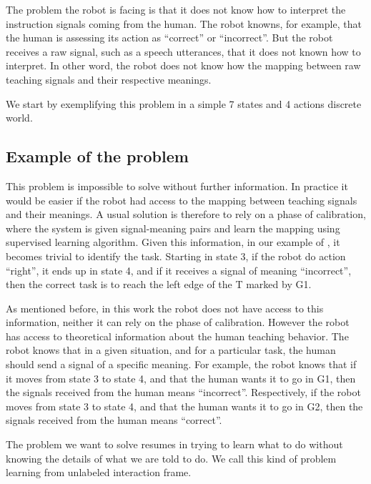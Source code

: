 The problem the robot is facing is that it does not know how to interpret the instruction signals coming from the human. The robot knowns, for example, that the human is assessing its action as ``correct'' or ``incorrect''. But the robot receives a raw signal, such as a speech utterances, that it does not known how to interpret. In other word, the robot does not know how the mapping between raw teaching signals and their respective meanings.

We start by exemplifying this problem in a simple 7 states and 4 actions discrete world.

\subsection{Example of the problem}
\label{chapter:lfui:example}




\transition

This problem is impossible to solve without further information. In practice it would be easier if the robot had access to the mapping between teaching signals and their meanings. A usual solution is therefore to rely on a phase of calibration, where the system is given signal-meaning pairs and learn the mapping using supervised learning algorithm. Given this information, in our example of , it becomes trivial to identify the task. Starting in state 3, if the robot do action ``right'', it ends up in state 4, and if it receives a signal of meaning ``incorrect'', then the correct task is to reach the left edge of the T marked by G1.

As mentioned before, in this work the robot does not have access to this information, neither it can rely on the phase of calibration. However the robot has access to theoretical information about the human teaching behavior. The robot knows that in a given situation, and for a particular task, the human should send a signal of a specific meaning. For example, the robot knows that if it moves from state 3 to state 4, and that the human wants it to go in G1, then the signals received from the human means ``incorrect''. Respectively, if the robot moves from state 3 to state 4, and that the human wants it to go in G2, then the signals received from the human means ``correct''.

The problem we want to solve resumes in trying to learn what to do without knowing the details of what we are told to do. We call this kind of problem learning from unlabeled interaction frame. 

